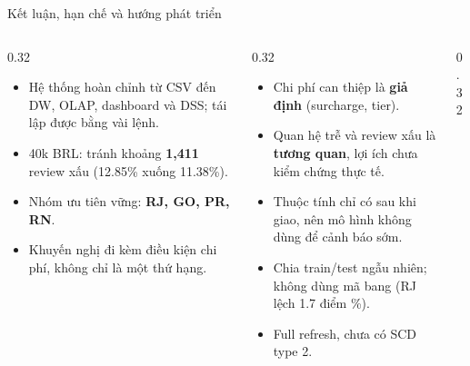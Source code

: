 \documentclass[aspectratio=169,10pt,xcolor=table]{beamer}
\begin{document}
\begin{frame}{Kết luận, hạn chế và hướng phát triển}
  \begin{columns}[T]
    \begin{column}{0.32\textwidth}
      \begin{tcolorbox}[enhanced,colback=good!6,colframe=good,boxrule=0pt,toprule=2.5pt,arc=1pt,fontupper=\scriptsize,title={Kết quả đạt được},coltitle=good,colbacktitle=good!6,fonttitle=\small\bfseries,height=6.3cm]
        \begin{itemize}\setlength{\itemsep}{2pt}
          \item Hệ thống hoàn chỉnh từ CSV đến DW, OLAP, dashboard và DSS; tái lập được bằng vài lệnh.
          \item 40k BRL: tránh khoảng \textbf{1,411} review xấu (12.85\% xuống 11.38\%).
          \item Nhóm ưu tiên vững: \textbf{RJ, GO, PR, RN}.
          \item Khuyến nghị đi kèm điều kiện chi phí, không chỉ là một thứ hạng.
        \end{itemize}
      \end{tcolorbox}
    \end{column}
    \begin{column}{0.32\textwidth}
      \begin{tcolorbox}[enhanced,colback=accent!6,colframe=accent,boxrule=0pt,toprule=2.5pt,arc=1pt,fontupper=\scriptsize,title={Hạn chế},coltitle=accent,colbacktitle=accent!6,fonttitle=\small\bfseries,height=6.3cm]
        \begin{itemize}\setlength{\itemsep}{2pt}
          \item Chi phí can thiệp là \textbf{giả định} (surcharge, tier).
          \item Quan hệ trễ và review xấu là \textbf{tương quan}, lợi ích chưa kiểm chứng thực tế.
          \item Thuộc tính chỉ có sau khi giao, nên mô hình không dùng để cảnh báo sớm.
          \item Chia train/test ngẫu nhiên; không dùng mã bang (RJ lệch 1.7 điểm \%).
          \item Full refresh, chưa có SCD type 2.
        \end{itemize}
      \end{tcolorbox}
    \end{column}
    \begin{column}{0.32\textwidth}
      \begin{tcolorbox}[enhanced,colback=bksky!6,colframe=bksky,boxrule=0pt,toprule=2.5pt,arc=1pt,fontupper=\scriptsize,title={Hướng phát triển},coltitle=bkblue,colbacktitle=bksky!6,fonttitle=\small\bfseries,height=6.3cm]

\end{tcolorbox}
\end{column}
\end{columns}
\end{frame}
\end{document}
